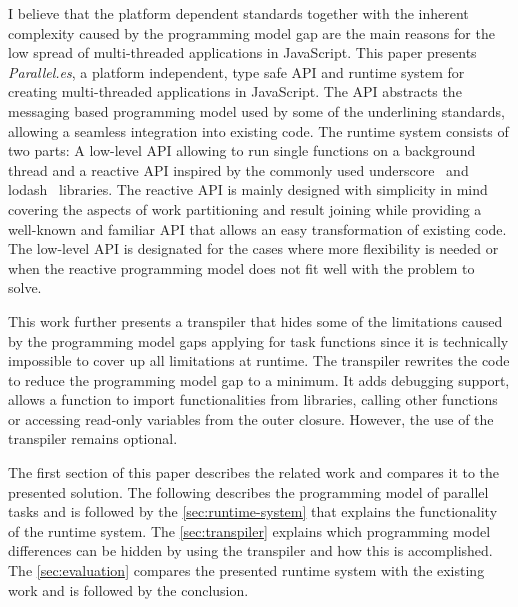 I believe that the platform dependent standards together with the inherent complexity caused by the programming model gap are the main reasons for the low spread of multi-threaded applications in JavaScript. This paper presents \textit{Parallel.es}, a platform independent, type safe API and runtime system for creating multi-threaded applications in JavaScript. The API abstracts the messaging based programming model used by some of the underlining standards, allowing a seamless integration into existing code. The runtime system consists of two parts: A low-level API allowing to run single functions on a background thread and a reactive API inspired by the commonly used underscore~\cite{underscorejs} and lodash~\cite{lodash} libraries. The reactive API is mainly designed with simplicity in mind covering the aspects of work partitioning and result joining while providing a well-known and familiar API that allows an easy transformation of existing code. The low-level API is designated for the cases where more flexibility is needed or when the reactive programming model does not fit well with the problem to solve. 

This work further presents a transpiler that hides some of the limitations caused by the programming model gaps applying for task functions since it is technically impossible to cover up all limitations at runtime. The transpiler rewrites the code to reduce the programming model gap to a minimum. It adds debugging support, allows a function to import functionalities from libraries, calling other functions or accessing read-only variables from the outer closure. However, the use of the transpiler remains optional. 


The first section of this paper describes the related work and compares it to the presented solution. The following describes the programming model of parallel tasks and is followed by the \cref{sec:runtime-system} that explains the functionality of the runtime system. The \cref{sec:transpiler} explains which programming model differences can be hidden by using the transpiler and how this is accomplished. The \cref{sec:evaluation} compares the presented runtime system with the existing work and is followed by the conclusion. 